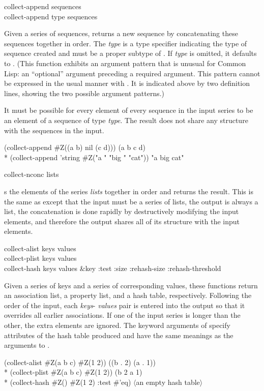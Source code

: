 \begin{defun}[Function]
collect-append sequences \\
collect-append type sequences

Given a series of sequences,  returns a new sequence by
concatenating these sequences together in order.  The \emph{type} is a type
specifier indicating the type of sequence created and must be a proper
subtype of .  If \emph{type} is omitted, it defaults to
.  (This function exhibits an argument pattern that is unusual for Common
Lisp:  an ``optional'' argument preceding a required argument.  This
pattern cannot be expressed in the usual manner with .  It
is indicated above by two definition lines, showing the two possible
argument patterns.)

It must be possible for every element of every sequence in the input series
to be an element of a sequence of type \emph{type}.  The result does not
share any structure with the sequences in the input.
\begin{lisp}
(collect-append \#Z((a b) nil (c d))) {\EV} (a b c d) \\*
(collect-append 'string \#Z("a " "big " "cat")) {\EV} "a big cat"
\end{lisp}
\end{defun}

\begin{defun}[Function]
collect-nconc lists

 s the elements of the series {\it
lists} together in order and returns the result.  This is the same as
 except that the input must be a series of lists,
the output is always a list, the concatenation is done rapidly by
destructively modifying the input elements, and therefore the output
shares all of its structure with the input elements.
\end{defun}

\begin{defun}[Function]
collect-alist keys values \\
collect-plist keys values \\
collect-hash keys values &key :test :size :rehash-size :rehash-threshold

\noindent Given a series of keys and a series of corresponding values, these
functions return an association list, a property list, and a hash table,
respectively.  Following the order of the input, each \emph{keys}-{\it
values} pair is entered into the output so that it overrides all
earlier associations.  If one of the input series is longer than the other,
the extra elements are ignored.  The keyword arguments of 
 specify attributes of the hash table produced and have the
same meanings as the arguments to .
\begin{lisp}
(collect-alist \#Z(a b c) \#Z(1 2)) {\EV} ((b . 2) (a . 1)) \\*
(collect-plist \#Z(a b c) \#Z(1 2)) {\EV} (b 2 a 1) \\*
(collect-hash \#Z() \#Z(1 2) :test \#'eq) {\EV} {\rm $\langle$an empty hash table$\rangle$}
\end{lisp}
\end{defun}

